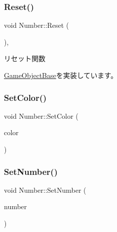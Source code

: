 \mbox{\label{class_number_a7c6facdb1b3d0acc8309e0a915863d44}} 
\subsubsection{\texorpdfstring{Reset()}{Reset()}}
{\footnotesize\ttfamily void Number\+::\+Reset (\begin{DoxyParamCaption}{ }\end{DoxyParamCaption})\hspace{0.3cm}{\ttfamily [override]}, {\ttfamily [virtual]}}



リセット関数 



\mbox{\hyperlink{class_game_object_base_a85c59554f734bcb09f1a1e18d9517dce}{Game\+Object\+Base}}を実装しています。

\mbox{\label{class_number_a1ea98cdee888a040f4530a6654657c44}} 
\subsubsection{\texorpdfstring{Set\+Color()}{SetColor()}}
{\footnotesize\ttfamily void Number\+::\+Set\+Color (\begin{DoxyParamCaption}\item[{\mbox{\hyperlink{_vector3_d_8h_a680c30c4a07d86fe763c7e01169cd6cc}{X\+Color4}}}]{color }\end{DoxyParamCaption})}

\mbox{\label{class_number_ac825b1ee1f46a6ac4ffd3bc904964745}} 
\subsubsection{\texorpdfstring{Set\+Number()}{SetNumber()}}
{\footnotesize\ttfamily void Number\+::\+Set\+Number (\begin{DoxyParamCaption}\item[{int}]{number }\end{DoxyParamCaption})}

\mbox{\label{class_number_a7c3bf9c55f7a0a19d80129c5f07f99f2}} 
